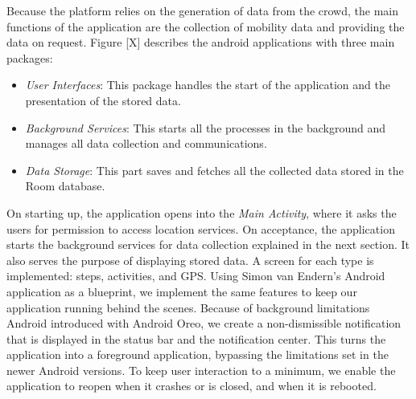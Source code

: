 Because the platform relies on the generation of data from the crowd, the main functions of the application are the collection of mobility data and providing the data on request. Figure [X] describes the android applications with three main packages:

\begin{itemize}
    \item \textit{User Interfaces}: This package handles the start of the application and the presentation of the stored data.
    \item \textit{Background Services}: This starts all the processes in the background and manages all data collection and communications.
    \item \textit{Data Storage}: This part saves and fetches all the collected data stored in the Room database.
\end{itemize}

On starting up, the application opens into the \textit{Main Activity}, where it asks the users for permission to access location services. On acceptance, the application starts the background services for data collection explained in the next section. It also serves the purpose of displaying stored data. A screen for each type is implemented: steps, activities, and GPS. Using Simon van Endern's Android application as a blueprint, we implement the same features to keep our application running behind the scenes. Because of background limitations Android introduced with Android Oreo, we create a non-dismissible notification that is displayed in the status bar and the notification center. This turns the application into a foreground application, bypassing the limitations set in the newer Android versions. To keep user interaction to a minimum, we enable the application to reopen when it crashes or is closed, and when it is rebooted.

